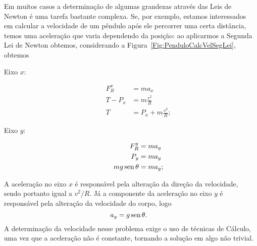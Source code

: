 Em muitos casos a determinação de algumas grandezas através das Leis de Newton é uma tarefa bastante complexa. Se, por exemplo, estamos interessados em calcular a velocidade de um pêndulo após ele percorrer uma certa distância, temos uma aceleração que varia dependendo da posição: ao aplicarmos a Segunda Lei de Newton obtemos, considerando a Figura~\ref{Fig:PenduloCalcVelSegLei}, obtemos
\begin{description}
    \item[Eixo $x$:]
        \begin{align}
            F_R^x &= m a_x \\
            T - P_x &= m \frac{v^2}{R} \\
            T &= P_x + m\frac{v^2}{R};
        \end{align}
    \item[Eixo $y$:]
        \begin{align}
            F_R^y &= m a_y \\
            P_y &= m a_y \\
            mg \operatorname{sen}\theta &= m a_y;
        \end{align}
\end{description}
%
A aceleração no eixo $x$ é responsável pela alteração da direção da velocidade, sendo portanto igual a $v^2/R$. Já a componente da aceleração no eixo $y$ é responsável pela alteração da velocidade do corpo, logo
\begin{equation}
    a_y = g \operatorname{sen}\theta.
\end{equation}
%
A determinação da velocidade nesse problema exige o uso de técnicas de Cálculo, uma vez que a aceleração não é constante, tornando a solução em algo não trivial.

